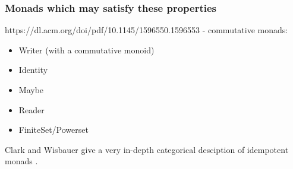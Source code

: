 \documentclass{article}
\begin{document}
\subsubsection{Monads which may satisfy these properties}

https://dl.acm.org/doi/pdf/10.1145/1596550.1596553 - commutative monads:
\begin{itemize}
	\item Writer (with a commutative monoid)
	\item Identity
	\item Maybe
	\item Reader
	\item FiniteSet/Powerset
\end{itemize}

Clark and Wisbauer give a very in-depth categorical desciption of idempotent monads \cite{idempotent_monads}.



\end{document}
